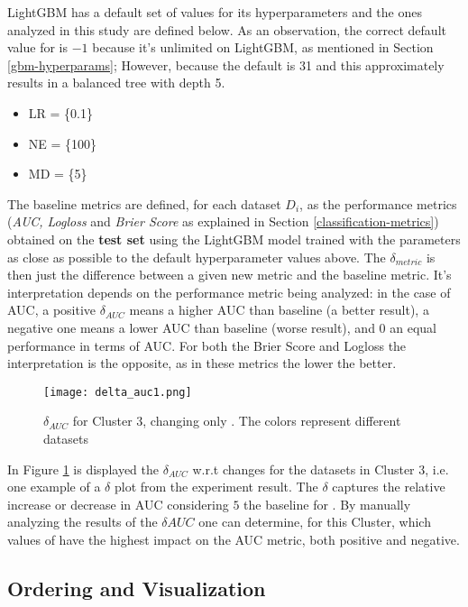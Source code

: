 LightGBM has a default set of values for its hyperparameters and the ones analyzed in this study  are defined below. As an observation, the correct default value for  is $-1$ because it's unlimited on LightGBM, as mentioned in Section \ref{gbm-hyperparams}; However, because the  default is 31 and this approximately results in a balanced tree with depth 5.

\begin{itemize}
    \item LR = \{0.1\}
    \item NE = \{100\}
    \item MD = \{5\}
\end{itemize}

The baseline metrics are defined, for each dataset $D_i$, as the performance metrics (\textit{AUC, Logloss} and \textit{Brier Score} as explained in Section \ref{classification-metrics}) obtained on the {\Large\textbf{test set}} using the LightGBM model trained with the parameters as close as possible to the default hyperparameter values above. The $\delta_{metric}$ is then just the difference between a given new metric and the baseline metric. It's interpretation depends on the performance metric being analyzed: in the case of AUC, a positive $\delta_{AUC}$ means a higher AUC than baseline (a better result), a negative one means a lower AUC than baseline (worse result), and $0$ an equal performance in terms of AUC. For both the Brier Score and Logloss the interpretation is the opposite, as in these metrics the lower the better.

\begin{figure}[!h]
    \centering
    \texttt{[image: delta\_auc1.png]}
    \caption{$\delta_{AUC}$ for Cluster 3, changing only . The colors represent different datasets}
    \label{fig:delta-auc1}
\end{figure}

In Figure \ref{fig:delta-auc1} is displayed the $\delta_{AUC}$ w.r.t  changes for the datasets in Cluster 3, i.e. one example of a $\delta$ plot from the experiment result. The $\delta$ captures the relative increase or decrease in AUC considering $5$ the baseline for . By manually analyzing the results of the $\delta{AUC}$ one can determine, for this Cluster, which values of  have the highest impact on the AUC metric, both positive and negative.

\subsection{Ordering and Visualization}

